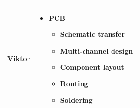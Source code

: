 \documentclass[conference]{IEEEtran}
\begin{document}
\begin{tabularx}{\linewidth}{ | c | X | }
	Viktor & \begin{itemize}
		         \item PCB
		               \begin{itemize}
			      \item Schematic transfer
			      \item Multi-channel design
			      \item Component layout
			      \item Routing
			      \item Soldering
		      \end{itemize}
	         \end{itemize}     \\
	\hline
\end{tabularx}
\end{document}
